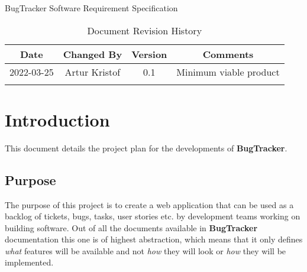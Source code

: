 \documentclass[a4paper]{article}
\newcommand{\appName}{BugTracker}
\newcommand{\appNameBold}{\textbf{BugTracker}}
\begin{document}
    \begin{titlepage}
        \vspace*{\fill}
        \begin{center}
            \huge
            \appName{}
            \vspace{0.4cm}
            \Huge
            Software Requirement Specification
            \vspace{3cm}
            \begin{table}[h]
                \centering
                \caption{Document Revision History}
                \begin{tabular}{cccc}
                    \hline
                    Date       & Changed By    & Version & Comments               \\
                    \hline
                    2022-03-25 & Artur Kristof & 0.1     & Minimum viable product \\
                    \hfill     & \hfill        & \hfill  & \hfill                 \\
                    \hline
                \end{tabular}
            \end{table}
        \end{center}
        \vspace*{\fill}
    \end{titlepage}




    \tableofcontents




    \pagebreak
    \section{Introduction}
    This document details the project plan for the developments of \appNameBold{}.

    \subsection{Purpose}
    The purpose of this project is to create a web application that can be used as a backlog of tickets, bugs, tasks, user stories etc. by development teams working on building software.
    Out of all the documents available in \appNameBold{} documentation this one is of highest abstraction, which means that it only defines \textit{what} features will be available
    and not \textit{how} they will look or \textit{how} they will be implemented.
\end{document}
